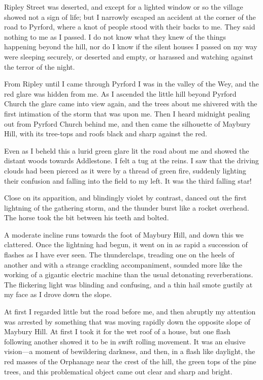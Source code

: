 Ripley Street was deserted, and except for a lighted window or so the village showed not a sign of life; but I narrowly escaped an accident at the corner of the road to Pyrford, where a knot of people stood with their backs to me. They said nothing to me as I passed. I do not know what they knew of the things happening beyond the hill, nor do I know if the silent houses I passed on my way were sleeping securely, or deserted and empty, or harassed and watching against the terror of the night.

From Ripley until I came through Pyrford I was in the valley of the Wey, and the red glare was hidden from me. As I ascended the little hill beyond Pyrford Church\label{cylinder3a} the glare came into view again, and the trees about me shivered with the first intimation of the storm that was upon me. Then I heard midnight pealing out from Pyrford Church behind me, and then came the silhouette of Maybury Hill, with its tree-tops and roofs black and sharp against the red.

Even as I beheld this a lurid green glare lit the road about me and showed the distant woods towards Addlestone.\label{cylinder3b} I felt a tug at the reins. I saw that the driving clouds had been pierced as it were by a thread of green fire, suddenly lighting their confusion and falling into the field to my left. It was the third falling star!

Close on its apparition, and blindingly violet by contrast, danced out the first lightning of the gathering storm, and the thunder burst like a rocket overhead. The horse took the bit between his teeth and bolted.

A moderate incline runs towards the foot of Maybury Hill, and down this we clattered. Once the lightning had begun, it went on in as rapid a succession of flashes as I have ever seen. The thunderclaps, treading one on the heels of another and with a strange crackling accompaniment, sounded more like the working of a gigantic electric machine than the usual detonating reverberations. The flickering light was blinding and confusing, and a thin hail smote gustily at my face as I drove down the slope.

At first I regarded little but the road before me, and then abruptly my attention was arrested by something that was moving rapidly down the opposite slope of Maybury Hill. At first I took it for the wet roof of a house, but one flash following another showed it to be in swift rolling movement. It was an elusive vision—a moment of bewildering darkness, and then, in a flash like daylight, the red masses of the Orphanage near the crest of the hill, the green tops of the pine trees, and this problematical object came out clear and sharp and bright.

